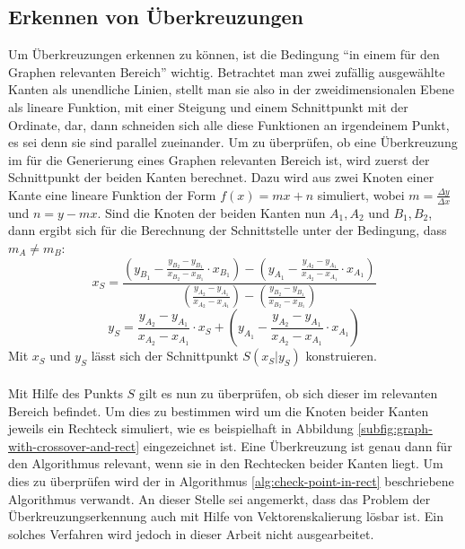 \subsection{Erkennen von Überkreuzungen} \label{sec:erkennen-von-ueberkreuzungen}
Um Überkreuzungen erkennen zu können, ist die Bedingung \enquote{in einem für den Graphen relevanten Bereich} wichtig.
Betrachtet man zwei zufällig ausgewählte Kanten als unendliche Linien, stellt man sie also in der zweidimensionalen Ebene als lineare Funktion, mit einer Steigung und einem Schnittpunkt mit der Ordinate, dar, dann schneiden sich alle diese Funktionen an irgendeinem Punkt, es sei denn sie sind parallel zueinander.
Um zu überprüfen, ob eine Überkreuzung im für die Generierung eines Graphen relevanten Bereich ist, wird zuerst der Schnittpunkt der beiden Kanten berechnet.
Dazu wird aus zwei Knoten einer Kante eine lineare Funktion der Form $f(x) =mx+n$ simuliert, wobei $m=\frac{\Delta y}{\Delta x}$ und $n=y - mx$.
Sind die Knoten der beiden Kanten nun $A_1,A_2$ und $B_1,B_2$, dann ergibt sich für die Berechnung der Schnittstelle unter der Bedingung, dass $m_A \neq m_B$:
\begin{equation}
    \label{eq:calculation-xs}
    x_S = \frac{(y_{B_1} - \frac{y_{B_2} - y_{B_1}}{x_{B_2} - x_{B_1}}\cdot x_{B_1}) - (y_{A_1} - \frac{y_{A_2} - y_{A_1}}{x_{A_2} - x_{A_1}}\cdot x_{A_1})}{(\frac{y_{A_2} - y_{A_1}}{x_{A_2} - x_{A_1}}) - (\frac{y_{B_2} - y_{B_1}}{x_{B_2} - x_{B_1}})} 
\end{equation}
\begin{equation}
    \label{eq:calculation-ys}
    y_S = \frac{y_{A_2} - y_{A_1}}{x_{A_2} - x_{A_1}}\cdot x_S + (y_{A_1} - \frac{y_{A_2} - y_{A_1}}{x_{A_2} - x_{A_1}}\cdot x_{A_1})
\end{equation}
Mit $x_S$ und $y_S$ lässt sich der Schnittpunkt $S(x_S|y_S)$ konstruieren.
\\\\
Mit Hilfe des Punkts $S$ gilt es nun zu überprüfen, ob sich dieser im relevanten Bereich befindet.
Um dies zu bestimmen wird um die Knoten beider Kanten jeweils ein Rechteck simuliert, wie es beispielhaft in Abbildung \vref{subfig:graph-with-crossover-and-rect} eingezeichnet ist.
Eine Überkreuzung ist genau dann für den Algorithmus relevant, wenn sie in den Rechtecken beider Kanten liegt.
Um dies zu überprüfen wird der in Algorithmus \vref{alg:check-point-in-rect} beschriebene Algorithmus verwandt.
An dieser Stelle sei angemerkt, dass das Problem der Überkreuzungserkennung auch mit Hilfe von Vektorenskalierung lösbar ist.
Ein solches Verfahren wird jedoch in dieser Arbeit nicht ausgearbeitet.


